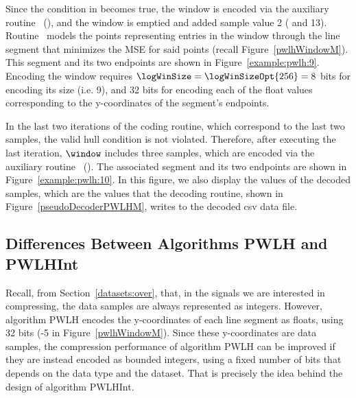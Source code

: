 

\clearpage


Since the condition in  becomes true, the window is encoded via the auxiliary routine \EncodeWindow\ (), and the window is emptied and added sample value 2 ( and 13). Routine \EncodeWindow\ models the points representing entries in the window through the line segment that minimizes the MSE for said points (recall Figure~\ref{pwlhWindowM}). This segment and its two endpoints are shown in Figure~\ref{example:pwlh:9}. Encoding the window requires $\logWinSize = \logWinSizeOpt{256}=8$ bits for encoding its size (i.e. 9), and 32 bits for encoding each of the float values corresponding to the y-coordinates of the segment's endpoints.




In the last two iterations of the coding routine, which correspond to the last two samples, the valid hull condition is not violated. Therefore, after executing the last iteration, $\window$ includes three samples, which are encoded via the auxiliary routine \EncodeLastWindowPWLH\ (). The associated segment and its two endpoints are shown in Figure~\ref{example:pwlh:10}. In this figure, we also display the values of the decoded samples, which are the values that the decoding routine, shown in Figure~\ref{pseudoDecoderPWLHM}, writes to the decoded csv data file. 






\clearpage
\subsection{Differences Between Algorithms PWLH and PWLHInt}
\label{algo:pwhl:int}


Recall, from Section~\ref{datasets:over}, that, in the signals we are interested in compressing, the data samples are always represented as integers. However, algorithm PWLH encodes the y-coordinates of each line segment as floats, using 32 bits (-5 in Figure~\ref{pwlhWindowM}). Since these y-coordinates are data samples, the compression performance of algorithm PWLH can be improved if they are instead encoded as bounded integers, using a fixed number of bits that depends on the data type and the dataset. That is precisely the idea behind the design of algorithm PWLHInt.



